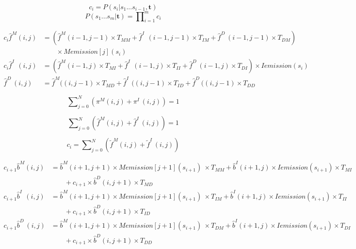 \documentclass[10pt]{article}
\begin{document}
    \begin{equation}
      c_{i} = P(s_{i} | s_1...s_{i-1},\mathbf{t})
    \end{equation}
    \begin{equation}
      P(s_1...s_m | \mathbf{t}) = \prod\nolimits_{i=1}^{m} c_i
    \end{equation}

    \begin{align}
      c_{i} \widehat{f}^{M}(i, j) &= (\widehat{f}^{M}(i-1, j-1) \times T_{MM}  + \widehat{f}^{I\;\;}(i-1, j-1) \times T_{IM} + \widehat{f}^{D\;}(i-1, j-1) \times T_{DM}) \\ 
        &\qquad\times Memission[j](s_{i}) \nonumber \\
      c_{i} \widehat{f}^{I\;\;}(i, j) &= (\widehat{f}^{M}(i-1, j) \times T_{MI}  + \widehat{f}^{I\;\;}(i-1, j) \times T_{II} + \widehat{f}^{D\;}(i-1, j) \times T_{DI}) \times Iemission(s_{i}) \\
      \widehat{f}^{D\;}(i, j) &= \widehat{f}^{M}((i, j-1) \times T_{MD}  + \widehat{f}^{I\;\;}((i, j-1) \times T_{ID} + \widehat{f}^{D\;}((i, j-1) \times T_{DD}
    \end{align}

    \begin{equation}
      \sum\nolimits_{j=0}^{N} \left( \pi^{M}(i, j) + \pi^{I\;}(i, j) \right) = 1
    \end{equation}

    \begin{equation}
      \sum\nolimits_{j=0}^{N} \left( \widehat{f}^{M}(i, j) + \widehat{f}^{I\;}(i, j) \right) = 1
    \end{equation}

    \begin{equation}
      c_{i} = \sum\nolimits_{j=0}^{N} \left( \widetilde{f}^{M}(i, j) + \widetilde{f}^{I\;}(i, j) \right)
    \end{equation}

    \begin{equation}
    \begin{aligned}
      c_{i+1} \widehat{b}^{M}(i, j) &= \widehat{b}^M(i+1, j+1) \times Memission[j+1](s_{i+1}) \
        \times T_{MM} + \widehat{b}^{I}(i+1, j) \times Iemission(s_{i+1}) \times T_{MI} \\
                 &\qquad+ c_{i+1} \times \widehat{b}^{D}(i, j+1) \times T_{MD} \\
      c_{i+1} \widehat{b}^{I\;\;}(i, j) &= \widehat{b}^M(i+1, j+1) \times Memission[j+1](s_{i+1}) \
        \times T_{IM} + \widehat{b}^{I}(i+1, j) \times Iemission(s_{i+1}) \times T_{II} \\
                  &\qquad+ c_{i+1} \times \widehat{b}^{D}(i, j+1) \times T_{ID} \\
      c_{i+1} \widehat{b}^{D\;}(i, j) &= \widehat{b}^M(i+1, j+1) \times Memission[j+1](s_{i+1}) \
        \times T_{DM} + \widehat{b}^{I}(i+1, j) \times Iemission(s_{i+1}) \times T_{DI} \\
                  &\qquad+ c_{i+1} \times \widehat{b}^{D}(i, j+1) \times T_{DD}
    \end{aligned}
    \end{equation}
\end{document}
